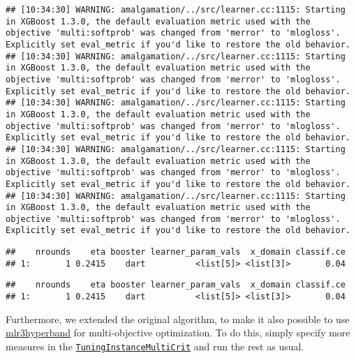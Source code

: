 \documentclass[
]{scrbook}
\newenvironment{Shaded}{\begin{snugshade}}{\end{snugshade}}
\newcommand{\NormalTok}[1]{#1}
\newcommand{\SpecialCharTok}[1]{\textcolor[rgb]{0.00,0.00,0.00}{#1}}
\renewenvironment{Shaded} {\begin{snugshade}\small} {\end{snugshade}}
\begin{document}
\begin{verbatim}
## [10:34:30] WARNING: amalgamation/../src/learner.cc:1115: Starting in XGBoost 1.3.0, the default evaluation metric used with the objective 'multi:softprob' was changed from 'merror' to 'mlogloss'. Explicitly set eval_metric if you'd like to restore the old behavior.
## [10:34:30] WARNING: amalgamation/../src/learner.cc:1115: Starting in XGBoost 1.3.0, the default evaluation metric used with the objective 'multi:softprob' was changed from 'merror' to 'mlogloss'. Explicitly set eval_metric if you'd like to restore the old behavior.
## [10:34:30] WARNING: amalgamation/../src/learner.cc:1115: Starting in XGBoost 1.3.0, the default evaluation metric used with the objective 'multi:softprob' was changed from 'merror' to 'mlogloss'. Explicitly set eval_metric if you'd like to restore the old behavior.
## [10:34:30] WARNING: amalgamation/../src/learner.cc:1115: Starting in XGBoost 1.3.0, the default evaluation metric used with the objective 'multi:softprob' was changed from 'merror' to 'mlogloss'. Explicitly set eval_metric if you'd like to restore the old behavior.
## [10:34:30] WARNING: amalgamation/../src/learner.cc:1115: Starting in XGBoost 1.3.0, the default evaluation metric used with the objective 'multi:softprob' was changed from 'merror' to 'mlogloss'. Explicitly set eval_metric if you'd like to restore the old behavior.
\end{verbatim}

\begin{verbatim}
##    nrounds    eta booster learner_param_vals  x_domain classif.ce
## 1:       1 0.2415    dart          <list[5]> <list[3]>       0.04
\end{verbatim}

\begin{Shaded}
\end{Shaded}

\begin{verbatim}
##    nrounds    eta booster learner_param_vals  x_domain classif.ce
## 1:       1 0.2415    dart          <list[5]> <list[3]>       0.04
\end{verbatim}

Furthermore, we extended the original algorithm, to make it also possible to use \href{https://mlr3hyperband.mlr-org.com}{mlr3hyperband} for multi-objective optimization.
To do this, simply specify more measures in the \href{https://mlr3tuning.mlr-org.com/reference/TuningInstanceMultiCrit.html}{\texttt{TuningInstanceMultiCrit}} and run the rest as usual.
\end{document}
